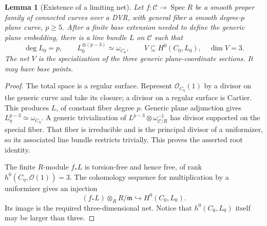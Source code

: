 \documentclass[11pt]{article}
\newtheorem{lemma}[theorem]{Lemma}
\theoremstyle{remark}\newtheorem{remark}[theorem]{Remark}
\newcommand{\OO}{\mathcal O}\newcommand{\Cl}{\operatorname{Cl}}\newcommand{\Pic}{\operatorname{Pic}}
\begin{document}
\begin{lemma}[Existence of a limiting net]\label{lem:net}
Let $f:\mathcal C\to\operatorname{Spec}R$ be a smooth proper family of connected curves over a DVR, with general fiber a smooth degree-$p$ plane curve, $p\geq5$. After a finite base extension needed to define the generic plane embedding, there is a line bundle $L$ on $\mathcal C$ such that
\[
 \deg L_0=p,\qquad L_0^{\otimes(p-3)}\simeq\omega_{C_0},
 \qquad V\subseteq H^0(C_0,L_0),\quad\dim V=3.
\]
The net $V$ is the specialization of the three generic plane-coordinate sections. It may have base points.
\end{lemma}
\begin{proof}
The total space is a regular surface. Represent $\OO_{C_\eta}(1)$ by a divisor on the generic curve and take its closure; a divisor on a regular surface is Cartier. This produces $L$, of constant fiber degree $p$. Generic plane adjunction gives $L_\eta^{p-3}\simeq\omega_{C_\eta}$. A generic trivialization of $L^{p-3}\otimes\omega_{\mathcal C/R}^{-1}$ has divisor supported on the special fiber. That fiber is irreducible and is the principal divisor of a uniformizer, so its associated line bundle restricts trivially. This proves the asserted root identity.

The finite $R$-module $f_*L$ is torsion-free and hence free, of rank $h^0(C_\eta,\OO(1))=3$. The cohomology sequence for multiplication by a uniformizer gives an injection
\[
 (f_*L)\otimes_R R/\mathfrak m\hookrightarrow H^0(C_0,L_0).
\]
Its image is the required three-dimensional net. Notice that $h^0(C_0,L_0)$ itself may be larger than three.
\end{proof}
\end{document}
